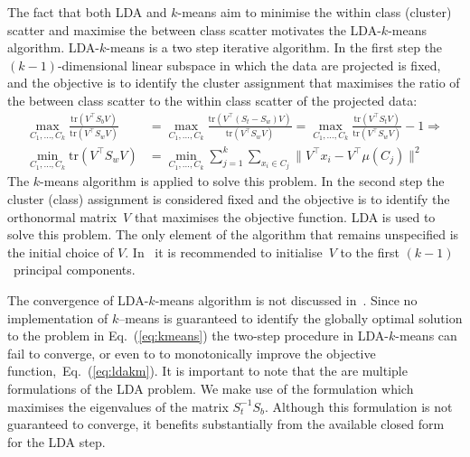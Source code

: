 \documentclass{book}
\def\tr#1{\mathrm{tr}\left(#1\right)}
\begin{document}
The fact that both LDA and $k$-means aim to minimise the within class (cluster)
scatter and maximise the between class scatter motivates the LDA-$k$-means
algorithm. 
%
LDA-$k$-means is a two step iterative algorithm. In the first step the
$(k-1)$-dimensional linear subspace in which the data are projected is
fixed, and the objective is to identify the cluster assignment that maximises
the ratio of the between class scatter to the within class scatter of the
projected data:
%
\begin{align*}
%
\max_{C_1,\ldots,C_k} \frac{\tr{V^\top S_b V}}{\tr{V^\top S_w V}} & = 
%
\max_{C_1,\ldots,C_k} \frac{\tr{V^\top (S_t - S_w) V}}{\tr{V^\top S_w V}} = 
%
\max_{C_1,\ldots,C_k} \frac{\tr{V^\top S_t V}}{\tr{V^\top S_w V}} -1 \Rightarrow \\
%
\min_{C_1,\ldots,C_k} \tr{V^\top S_w V} & = \min_{C_1,\ldots,C_k} \sum_{j=1}^k \sum_{x_i \in C_j} \|V^\top x_i - V^\top \mu(C_j)\|^2
%
\end{align*}
%
The $k$-means algorithm is applied to solve this problem.
%
In the second step the cluster (class) assignment is considered fixed and
the objective is to identify the orthonormal matrix~$V$ that maximises
the objective function. LDA is used to solve this problem.
The only element of the algorithm that remains
unspecified is the initial choice of $V$. In~\cite{DingL2007} it is
recommended to initialise~$V$ to the first $(k-1)$~principal components.


The convergence of LDA-$k$-means algorithm is not discussed
in~\cite{DingL2007}.
%
Since no implementation of $k$--means is guaranteed to identify the
globally optimal solution to the problem in Eq.~(\ref{eq:kmeans}) the two-step
procedure in LDA-$k$-means can fail to converge, or even to to
monotonically improve the objective function,~Eq.~(\ref{eq:ldakm}). 
%
It is important to note that the are multiple formulations of the LDA problem.
We make use of the formulation which maximises the eigenvalues of the matrix
$S_t^{-1}S_b$. Although this formulation is not guaranteed to converge, it
benefits substantially from the available closed form for the LDA step. 

%
%
\end{document}
